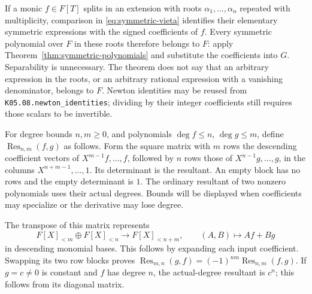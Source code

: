 If a monic $f\in F[T]$ splits in an extension with roots
$\alpha_1,\ldots,\alpha_n$ repeated with multiplicity, comparison
in \eqref{eq:symmetric-vieta} identifies their elementary symmetric
expressions with the signed coefficients of $f$.
Every symmetric polynomial over $F$ in these roots therefore belongs
to $F$: apply Theorem~\ref{thm:symmetric-polynomials} and substitute
the coefficients into $G$. Separability is unnecessary.
The theorem does not say that an arbitrary expression in the roots,
or an arbitrary rational expression with a vanishing denominator,
belongs to $F$. Newton identities may be reused from
\texttt{K05.08.newton\_identities}; dividing by their integer
coefficients still requires those scalars to be invertible.

For degree bounds $n,m\ge0$, and polynomials $\deg f\le n$,
$\deg g\le m$, define $\operatorname{Res}_{n,m}(f,g)$ as follows.
Form the square matrix with $m$ rows the descending coefficient
vectors of $X^{m-1}f,\ldots,f$, followed by $n$ rows those of
$X^{n-1}g,\ldots,g$, in the columns
$X^{n+m-1},\ldots,1$. Its determinant is the resultant.
An empty block has no rows and the empty determinant is $1$.
The ordinary resultant of two nonzero polynomials uses their
actual degrees. Bounds will be displayed when coefficients may
specialize or the derivative may lose degree.

The transpose of this matrix represents
\[
 F[X]_{<m}\oplus F[X]_{<n}\longrightarrow F[X]_{<n+m},
 \qquad(A,B)\longmapsto Af+Bg
\]
in descending monomial bases. This follows by expanding each input
coefficient. Swapping its two row blocks proves
$\operatorname{Res}_{m,n}(g,f)=(-1)^{nm}\operatorname{Res}_{n,m}(f,g)$.
If $g=c\ne0$ is constant and $f$ has degree $n$, the actual-degree
resultant is $c^n$; this follows from its diagonal matrix.


